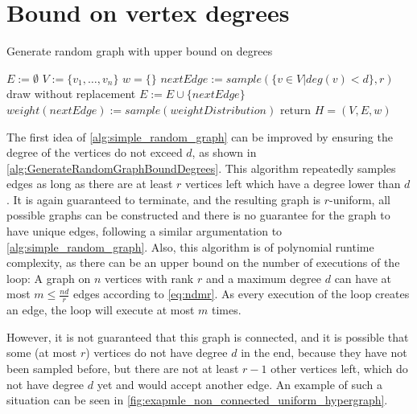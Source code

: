 \section{Bound on vertex degrees}
\begin{algorithm}
	\caption{Generate random graph with upper bound on degrees\label{alg:GenerateRandomGraphBoundDegrees}} 
	\begin{algorithmic}
		\State $E := \emptyset$
		\State $V := \{v_1, \ldots, v_n\}$
		\State $w = \{\}$
		\State $nextEdge := sample(\{v\in V| deg(v)< d\}, r) $ \Comment draw without replacement
		\State $E := E \cup \{nextEdge\}$
		\State $weight(nextEdge) := sample(weightDistribution)$ 
		\EndWhile
		\State  return $H = (V, E, w)$
		\EndFunction
	\end{algorithmic}
\end{algorithm}	
The first idea of \cref{alg:simple_random_graph} can be improved by ensuring the degree of the vertices do not exceed $d$, as shown in \cref{alg:GenerateRandomGraphBoundDegrees}. This algorithm repeatedly samples edges as long as there are at least $r$ vertices left which have a degree lower than $d$. It is again guaranteed to terminate, and the resulting graph is $r$-uniform, all possible graphs can be constructed and there is no guarantee for the graph to have unique edges, following a similar argumentation to \cref{alg:simple_random_graph}. Also, this algorithm is of polynomial runtime complexity, as there can be an upper bound on the number of executions of the loop: A graph on $n$ vertices with rank $r$ and a maximum degree $d$ can have at most $m \le \frac{nd}{r}$ edges according to \cref{eq:ndmr}. As every execution of the loop creates an edge, the loop will execute at most $m$ times. 



However, it is not guaranteed that this graph is connected, and it is possible that some (at most $ r$) vertices do not have degree $d$ in the end, because they have not been sampled before, but there are not at least $r-1$ other vertices left, which do not have degree $d$ yet and would accept another edge. An example of such a situation can be seen in \cref{fig:exapmle_non_connected_uniform_hypergraph}.


